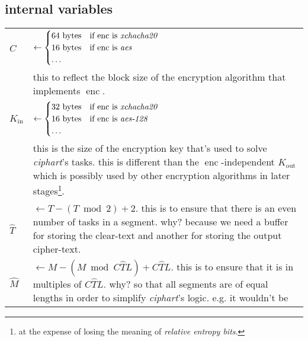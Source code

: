 \documentclass[twocolumn]{article}
\DeclareMathOperator{\enc}{enc}
\begin{document}
\subsection{internal variables}
\begin{tabularx}{\columnwidth}{lX}
    $C$         & $\gets \begin{cases}
                        64 \text{ bytes} & \text{if $\enc$ is
                                            \emph{xchacha20}}\\
                        16 \text{ bytes} & \text{if $\enc$ is \emph{aes}}\\
                        \ldots & \\
                     \end{cases}$\\
                & this to reflect the block size of the encryption
                    algorithm that implements $\enc$.\\
    $K_{\text{in}}$ & $\gets \begin{cases}
                        32 \text{ bytes} & \text{if $\enc$ is
                                            \emph{xchacha20}}\\
                        16 \text{ bytes} & \text{if $\enc$ is
                            \emph{aes-128}}\\
                        \ldots & \\
                     \end{cases}$\\
                & this is the size of the encryption key that's used to
                    solve \emph{ciphart}'s tasks.  this is different than
                    the $\enc$-independent $K_{\text{out}}$ which is
                    possibly used by other encryption algorithms in later
                    stages\footnote{at the expense of losing the meaning of
                    \emph{relative entropy bits}.}.\\
    $\hat T$    & $\gets T - (T \bmod 2) + 2$.  this is to ensure that
                    there is an even number of tasks in a segment.  why?
                    because we need a buffer for storing the clear-text and
                    another for storing the output cipher-text.\\
    $\hat M$    & $\gets M - (M \bmod C\hat TL) + C\hat TL$.  this is to
                    ensure that it is in multiples of $C\hat TL$.  why?  so
                    that all segments are of equal lengths in order to
                    simplify \emph{ciphart}'s logic.  e.g. it wouldn't be

\end{tabularx}
\end{document}
